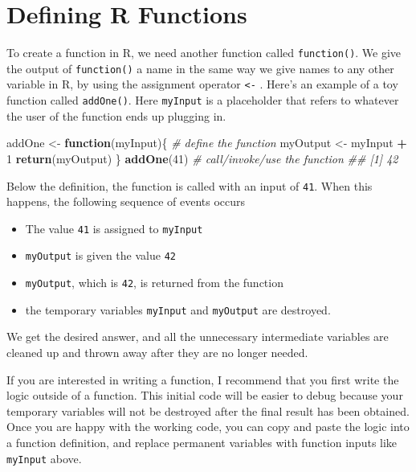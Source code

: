 \documentclass[12pt,krantz2]{krantz}
\makeatletter
\newenvironment{Shaded}{\begin{snugshade}}{\end{snugshade}}
\newcommand{\CommentTok}[1]{\textcolor[rgb]{0.37,0.37,0.37}{\textit{#1}}}
\newcommand{\ControlFlowTok}[1]{\textcolor[rgb]{0.27,0.27,0.27}{\textbf{#1}}}
\newcommand{\DecValTok}[1]{\textcolor[rgb]{0.06,0.06,0.06}{#1}}
\newcommand{\KeywordTok}[1]{\textcolor[rgb]{0.27,0.27,0.27}{\textbf{#1}}}
\newcommand{\NormalTok}[1]{#1}
\newcommand{\OperatorTok}[1]{\textcolor[rgb]{0.43,0.43,0.43}{\textbf{#1}}}
\newcommand{\StringTok}[1]{\textcolor[rgb]{0.5,0.5,0.5}{#1}}
\providecommand{\tightlist}{%
  \setlength{\itemsep}{0pt}\setlength{\parskip}{0pt}}
\newenvironment{kframe}{%
\medskip{}
\setlength{\fboxsep}{.8em}
 \def\at@end@of@kframe{}%
 \ifinner\ifhmode%
  \def\at@end@of@kframe{\end{minipage}}%
  \begin{minipage}{\columnwidth}%
 \fi\fi%
 \def\FrameCommand##1{\hskip\@totalleftmargin \hskip-\fboxsep
 \colorbox{shadecolor}{##1}\hskip-\fboxsep
     \hskip-\linewidth \hskip-\@totalleftmargin \hskip\columnwidth}%
 \MakeFramed {\advance\hsize-\width
   \@totalleftmargin\z@ \linewidth\hsize
   \@setminipage}}%
 {\par\unskip\endMakeFramed%
 \at@end@of@kframe}
\renewenvironment{Shaded}{\begin{kframe}}{\end{kframe}}
\makeatother
\begin{document}
\hypertarget{defining-r-functions}{%
\section{Defining R Functions}\label{defining-r-functions}}

To create a function in R, we need another function called \texttt{function()}. We give the output of \texttt{function()} a name in the same way we give names to any other variable in R, by using the assignment operator \texttt{\textless{}-} . Here's an example of a toy function called \texttt{addOne()}. Here \texttt{myInput} is a placeholder that refers to whatever the user of the function ends up plugging in.

\begin{Shaded}
\begin{Highlighting}[]
\NormalTok{addOne <-}\StringTok{ }\ControlFlowTok{function}\NormalTok{(myInput)\{  }\CommentTok{# define the function}
\NormalTok{  myOutput <-}\StringTok{ }\NormalTok{myInput }\OperatorTok{+}\StringTok{ }\DecValTok{1}
  \KeywordTok{return}\NormalTok{(myOutput)}
\NormalTok{\}}
\KeywordTok{addOne}\NormalTok{(}\DecValTok{41}\NormalTok{) }\CommentTok{# call/invoke/use the function }
\CommentTok{## [1] 42}
\end{Highlighting}
\end{Shaded}

Below the definition, the function is called with an input of \texttt{41}. When this happens, the following sequence of events occurs

\begin{itemize}
\tightlist
\item
  The value \texttt{41} is assigned to \texttt{myInput}
\item
  \texttt{myOutput} is given the value \texttt{42}
\item
  \texttt{myOutput}, which is \texttt{42}, is returned from the function
\item
  the temporary variables \texttt{myInput} and \texttt{myOutput} are destroyed.
\end{itemize}

We get the desired answer, and all the unnecessary intermediate variables are cleaned up and thrown away after they are no longer needed.

\begin{rmd-caution}
If you are interested in writing a function, I recommend that you first write the logic outside of a function. This initial code will be easier to debug because your temporary variables will not be destroyed after the final result has been obtained. Once you are happy with the working code, you can copy and paste the logic into a function definition, and replace permanent variables with function inputs like \texttt{myInput} above.

\end{rmd-caution}
\end{document}
